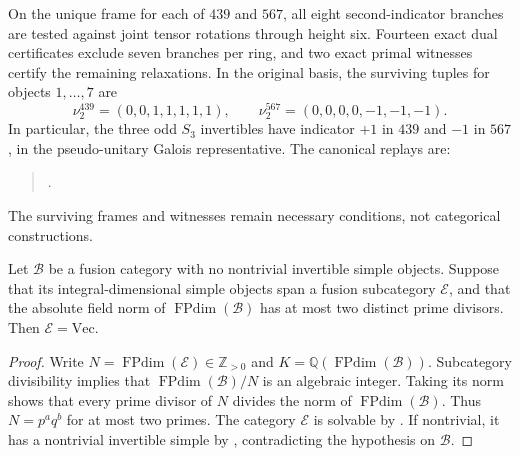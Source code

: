 On the unique frame for each of $439$ and $567$, all eight second-indicator
branches are tested against joint tensor rotations through height six.
Fourteen exact dual certificates exclude seven branches per ring, and
two exact primal witnesses certify the remaining relaxations. In the
original basis, the surviving tuples for objects $1,\ldots,7$ are
\[
 \nu_2^{439}=(0,0,1,1,1,1,1),\qquad
 \nu_2^{567}=(0,0,0,0,-1,-1,-1).
\]
In particular, the three odd $S_3$ invertibles have indicator $+1$ in
$439$ and $-1$ in $567$, in the pseudo-unitary Galois representative.
The canonical replays are:
\begin{quote}\small
{}\par
{}.
\end{quote}
The surviving frames and witnesses remain necessary conditions, not
categorical constructions.

\begin{proposition}
\label{prop:frontier-integral-center}
Let $\mathcal B$ be a fusion category with no nontrivial invertible simple
objects. Suppose that its integral-dimensional simple objects span a fusion
subcategory $\mathcal E$, and that the absolute field norm of
$\operatorname{FPdim}(\mathcal B)$ has at most two distinct prime divisors.
Then $\mathcal E=\mathrm{Vec}$.
\end{proposition}
\begin{proof}
Write $N=\operatorname{FPdim}(\mathcal E)\in\mathbb Z_{>0}$ and
$K=\mathbb Q(\operatorname{FPdim}(\mathcal B))$.
Subcategory divisibility \cite[Proposition~8.15]{ENO} implies that
$\operatorname{FPdim}(\mathcal B)/N$ is an algebraic integer.
Taking its norm shows that every prime divisor of $N$ divides the norm of
$\operatorname{FPdim}(\mathcal B)$. Thus $N=p^a q^b$ for at most two primes.
The category $\mathcal E$ is solvable by \cite[Theorem~1.6]{ENOSolvable}.
If nontrivial, it has a nontrivial invertible simple by
\cite[Proposition~4.5(iv)]{ENOSolvable}, contradicting the hypothesis on
$\mathcal B$.
\end{proof}

